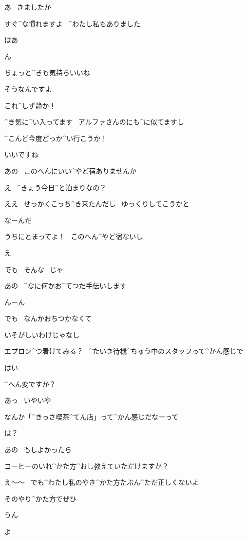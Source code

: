 \Kokone あ
\ きましたか

\Kokone すぐ^{な}{慣}れますよ
\ ^{わたし}{私}もありました

\Alpha はあ

\page[11]
\Alpha ん

\Alpha ちょっと^{きも}{気持}ちいいね

\Kokone そうなんですよ

\Alpha これ^{しず}{静}か！

\Kokone ^{き}{気}に^{い}{入}ってます
\ アルファさんのにも^{に}{似}てますし

\Alpha ^{こんど}{今度}どっか^{い}{行}こうか！

\Kokone いいですね

\page[12]
\Kokone あの
\ このへんにいい^{やど}{宿}ありませんか

\Alpha え
\ ^{きょう}{今日}^{と}{泊}まりなの？

\Kokone ええ
\ せっかくこっち^{き}{来}たんだし
\ ゆっくりしてこうかと

\Alpha なーんだ

\Alpha うちにとまってよ！
\ このへん^{やど}{宿}ないし

\Kokone え

\Kokone でも
\ そんな
\ じゃ

\page[13]
\Kokone あの
\ ^{なに}{何}かお^{てつだ}{手伝}いします

\Alpha んーん

\Kokone でも
\ なんかおちつかなくて

\Alpha いそがしいわけじゃなし

\Alpha エプロン^{つ}{着}けてみる？
\ ^{たいき}{待機}^{ちゅう}{中}のスタッフって^{かん}{感}じで

\Kokone はい

\page[14]
\Kokone ^{へん}{変}ですか？

\Alpha あっ
\ いやいや

\Alpha なんか「^{きっさ}{喫茶}^{てん}{店}」って^{かん}{感}じだなーって

\Kokone は？

\page[15]
\Kokone あの
\ もしよかったら

\Kokone コーヒーのいれ^{かた}{方}^{おし}{教}えていただけますか？

\Alpha え〜〜
\ でも^{わたし}{私}のやき^{かた}{方}たぶん^{ただ}{正}しくないよ

\Kokone そのやり^{かた}{方}でぜひ

\Alpha うん

\page[16]
\Ojisan よ

